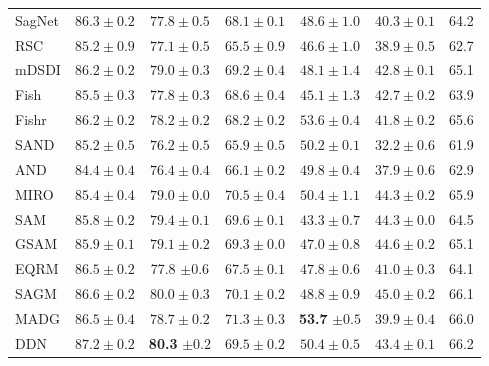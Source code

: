 \begin{table}[t]
\begin{tabular}{lcccccc}
SagNet \citep{nam2021reducing} & $86.3 \pm 0.2$ & $77.8 \pm 0.5$ & $68.1 \pm 0.1$ & $48.6 \pm 1.0$ & $40.3 \pm 0.1$ & 64.2 \\
RSC \citep{huang2020self} & $85.2 \pm 0.9$ & $77.1 \pm 0.5$ & $65.5 \pm 0.9$ & $46.6 \pm 1.0$ & $38.9 \pm 0.5$ & 62.7 \\
mDSDI \citep{bui2021exploiting} & $86.2 \pm 0.2$ & $79.0 \pm 0.3$ & $69.2 \pm 0.4$ & $48.1 \pm 1.4$ & $42.8 \pm 0.1$ & 65.1 \\
Fish \citep{shi2022gradient} & $85.5 \pm 0.3$ & $77.8 \pm 0.3$ & $68.6 \pm 0.4$ & $45.1 \pm 1.3$ & $42.7 \pm 0.2$ & 63.9 \\
Fishr \citep{rame2022fishr} & $86.2 \pm 0.2$ & $78.2 \pm 0.2$ & $68.2 \pm 0.2$ & $53.6 \pm 0.4$ & $41.8 \pm 0.2$ & 65.6 \\
SAND \citep{shahtalebi2021sandmask} & $85.2 \pm 0.5$ & $76.2 \pm 0.5$ & $65.9 \pm 0.5$ & $50.2 \pm 0.1$ & $32.2 \pm 0.6$ & 61.9 \\
AND \citep{park2021andmask} & $84.4 \pm 0.4$ & $76.4 \pm 0.4$ & $66.1 \pm 0.2$ & $49.8 \pm 0.4$ & $37.9 \pm 0.6$ & 62.9 \\
MIRO \citep{cha2022domain} & $85.4 \pm 0.4$ & $79.0 \pm 0.0$ & $70.5 \pm 0.4$ & $50.4 \pm 1.1$ & $44.3 \pm 0.2$ & 65.9 \\
SAM \citep{foret2021sharpness} & $85.8 \pm 0.2$ & $79.4 \pm 0.1$ & $69.6 \pm 0.1$ & $43.3 \pm 0.7$ & $44.3 \pm 0.0$ & 64.5 \\
GSAM \citep{zhuang2022surrogate} & $85.9 \pm 0.1$ & $79.1 \pm 0.2$ & $69.3 \pm 0.0$ & $47.0 \pm 0.8$ & $44.6 \pm 0.2$ & 65.1 \\
EQRM \citep{eastwood2022probable} & $86.5 \pm 0.2$ & 77.8 $\pm 0.6$ & $67.5 \pm 0.1$ & $47.8 \pm 0.6$ & $41.0 \pm 0.3$ & 64.1 \\
SAGM \citep{wang2023sharpness} & $86.6 \pm 0.2$ & $80.0 \pm 0.3$ & $70.1 \pm 0.2$ & $48.8 \pm 0.9$ & $45.0 \pm 0.2$ & 66.1 \\
MADG \citep{madg2023} & $86.5 \pm 0.4$ & $78.7 \pm 0.2$ & $71.3 \pm 0.3$ & \textbf{53.7} $\pm 0.5$ & $39.9 \pm 0.4$ & 66.0 \\
DDN \citep{zhang2023aggregation} & $87.2 \pm 0.2$ & \textbf{80.3} $\pm 0.2$ & $69.5 \pm 0.2$ & $50.4 \pm 0.5$ & $43.4 \pm 0.1$ & 66.2 \\

\end{tabular}
\end{table}
